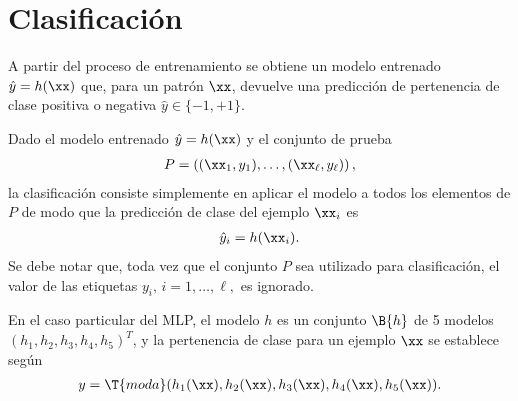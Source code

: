 %
%
%
\section{Clasificación}
%
A partir del proceso de entrenamiento se obtiene un modelo entrenado
$\hat{y} = h(\xx)$ que, para un patrón $\xx$, devuelve una predicción
de pertenencia de clase positiva o negativa $\hat{y}\in\{-1,+1\}$.

Dado el modelo entrenado $\hat{y} = h(\xx)$ y el conjunto de prueba
%
\begin{align*}
  P = \left( (\xx_1,y_1),\ldots,(\xx_\ell,y_\ell) \right),
\end{align*}
%
la clasificación consiste simplemente en aplicar el modelo a todos los
elementos de $P$ de modo que la predicción de clase del ejemplo
$\xx_i$ es
%
\begin{align*}
  \hat{y}_i = h(\xx_i).
\end{align*}
%
Se debe notar que, toda vez que el conjunto $P$ sea utilizado para
clasificación, el valor de las etiquetas $y_i,\,i=1,\ldots,\ell,$ es
ignorado.

En el caso particular del MLP, el modelo $h$ es un conjunto $\B{h}$
de 5 modelos $(h_1, h_2, h_3, h_4, h_5)^T$, y la pertenencia de clase para
un ejemplo $\xx$ se establece según
%
\begin{align}
  y = \T{moda}( h_1(\xx), h_2(\xx), h_3(\xx), h_4(\xx), h_5(\xx)).
\end{align}
%
